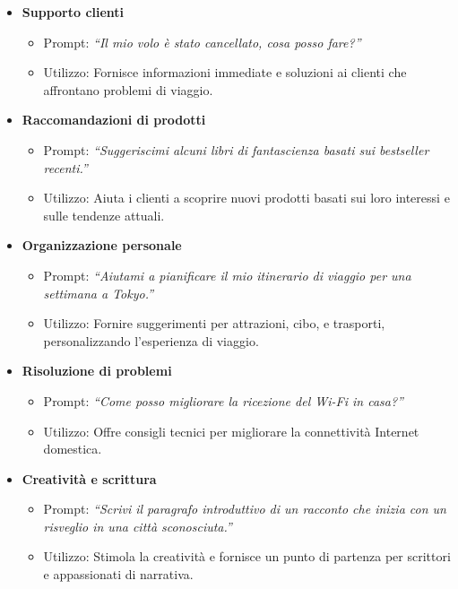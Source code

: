 \begin{itemize}
                \item \textbf{Supporto clienti}
                \begin{itemize}
                    \item Prompt: \textit{``Il mio volo è stato cancellato, cosa posso fare?''}
                    \item Utilizzo: Fornisce informazioni immediate e soluzioni ai clienti che affrontano problemi di viaggio.
                \end{itemize}
                
                \item \textbf{Raccomandazioni di prodotti}
                \begin{itemize}
                    \item Prompt: \textit{``Suggeriscimi alcuni libri di fantascienza basati sui bestseller recenti.''}
                    \item Utilizzo: Aiuta i clienti a scoprire nuovi prodotti basati sui loro interessi e sulle tendenze attuali.
                \end{itemize}
                
                \item \textbf{Organizzazione personale}
                \begin{itemize}
                    \item Prompt: \textit{``Aiutami a pianificare il mio itinerario di viaggio per una settimana a Tokyo.''}
                    \item Utilizzo: Fornire suggerimenti per attrazioni, cibo, e trasporti, personalizzando l'esperienza di viaggio.
                \end{itemize}
                
                \item \textbf{Risoluzione di problemi}
                \begin{itemize}
                    \item Prompt: \textit{``Come posso migliorare la ricezione del Wi-Fi in casa?''}
                    \item Utilizzo: Offre consigli tecnici per migliorare la connettività Internet domestica.
                \end{itemize}
                
                \item \textbf{Creatività e scrittura}
                \begin{itemize}
                    \item Prompt: \textit{``Scrivi il paragrafo introduttivo di un racconto che inizia con un risveglio in una città sconosciuta.''}
                    \item Utilizzo: Stimola la creatività e fornisce un punto di partenza per scrittori e appassionati di narrativa.
                \end{itemize}
                

\end{itemize}
